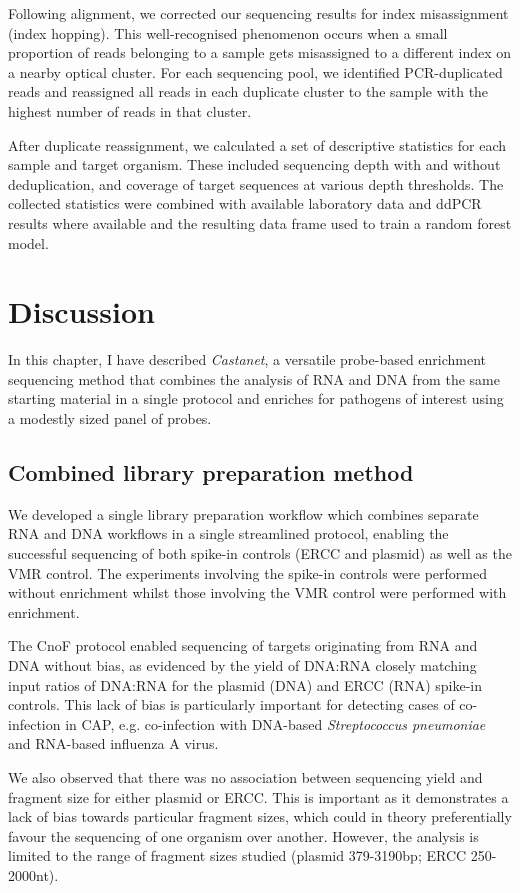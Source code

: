 Following alignment, we corrected our sequencing results for index misassignment (index hopping). This well-recognised phenomenon occurs when a small proportion of reads belonging to a sample gets misassigned to a different index on a nearby optical cluster. For each sequencing pool, we identified PCR-duplicated reads and reassigned all reads in each duplicate cluster to the sample with the highest number of reads in that cluster.

After duplicate reassignment, we calculated a set of descriptive statistics for each sample and target organism. These included sequencing depth with and without deduplication, and coverage of target sequences at various depth thresholds. The collected statistics were combined with available laboratory data and ddPCR results where available and the resulting data frame used to train a random forest model. 

\section{Discussion}
In this chapter, I have described \textit{Castanet}, a versatile probe-based enrichment sequencing method that combines the analysis of RNA and DNA from the same starting material in a single protocol and enriches for pathogens of interest using a modestly sized panel of probes.

\subsection{Combined library preparation method}
We developed a single library preparation workflow which combines separate RNA and DNA workflows in a single streamlined protocol, enabling the successful sequencing of both spike-in controls (ERCC and plasmid) as well as the VMR control. The experiments involving the spike-in controls were performed without enrichment whilst those involving the VMR control were performed with enrichment.

The CnoF protocol enabled sequencing of targets originating from RNA and DNA without bias, as evidenced by the yield of DNA:RNA closely matching input ratios of DNA:RNA for the plasmid (DNA) and ERCC (RNA) spike-in controls. This lack of bias is particularly important for detecting cases of co-infection in CAP, e.g. co-infection with DNA-based \textit{Streptococcus pneumoniae} and RNA-based influenza A virus. 

We also observed that there was no association between sequencing yield and fragment size for either plasmid or ERCC. This is important as it demonstrates a lack of bias towards particular fragment sizes, which could in theory preferentially favour the sequencing of one organism over another. However, the analysis is limited to the range of fragment sizes studied (plasmid 379-3190bp; ERCC 250-2000nt). 

